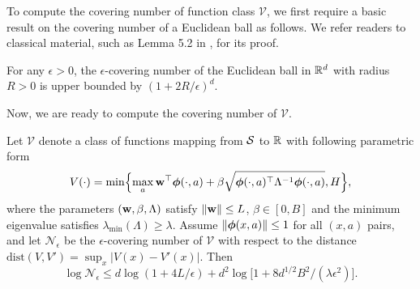 To compute the covering number of function class $\mathcal{V}$, we first require a basic result on the covering number of a Euclidean ball as follows. We refer readers to classical material, such as Lemma 5.2 in \cite{vershynin2010introduction}, for its proof.

\begin{lemma}  \label{lem:euclid}
    For any $\epsilon > 0$, the $\epsilon$-covering number of the  Euclidean ball in $\mathbb{R}^d$ with radius $R> 0$ is upper bounded by $(1 + 2 R/ \epsilon )^d$. 
\end{lemma}

Now, we are ready to compute the covering number of $\mathcal{V}$.

\begin{lemma} \label{lem:covering_number}
Let $\mathcal{V}$ denote a class of functions mapping from $\mathcal{S}$ to $\mathbb{R}$ with following parametric form
$$V(\cdot) = \min \Bigl \{\max_a \mathbf{w}^{\top}\bm{\phi}(\cdot, a) + \beta \sqrt{\bm{\phi}(\cdot, a) ^{\top}\Lambda^{-1} \bm{\phi}(\cdot, a)}, H \Bigr \},$$
where the parameters $(\mathbf{w}, \beta, \Lambda)$ satisfy $\left\|{\mathbf{w}}\right\| \le L$, $\beta \in [0, B] $ and the minimum eigenvalue satisfies $\lambda_{\min}(\Lambda) \ge \lambda$. Assume $\left\|{\bm{\phi}(x, a)}\right\|\le 1$ for all $(x, a)$ pairs, and let $\mathcal{N}_{\epsilon}$ be the $\epsilon$-covering number of $\mathcal{V}$ with respect to the distance $\mathrm{dist}(V, V') = \sup_{x} |V(x) - V'(x)|$. Then
\begin{equation*}
\log \mathcal{N}_{\epsilon} \le d  \log (1+ 4L / \epsilon ) + d^2 \log \bigl [ 1 +  8 d^{1/2} B^2  / (\lambda\epsilon^2)  \bigr ].
\end{equation*}
\end{lemma}


